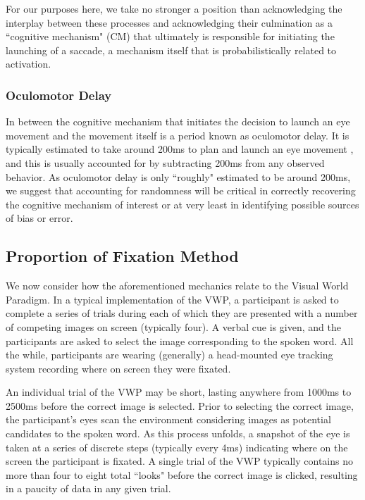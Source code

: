 \documentclass{article}
\begin{document}
For our purposes here, we take no stronger a position than acknowledging the interplay between these processes and acknowledging their culmination as a ``cognitive mechanism" (CM) that ultimately is responsible for initiating the launching of a saccade, a mechanism itself that is probabilistically related to activation.



\subsubsection{Oculomotor Delay}

In between the cognitive mechanism that initiates the decision to launch an eye movement and the movement itself is a period known as oculomotor delay. It is typically estimated to take around 200ms to plan and launch an eye movement \citep{viviani1990time}, and this is usually accounted for by subtracting 200ms from any observed behavior. As oculomotor delay is only ``roughly" estimated to be around 200ms, we suggest that accounting for randomness will be critical in correctly recovering the cognitive mechanism of interest or at very least in identifying possible sources of bias or error. 





\subsection{Proportion of Fixation Method}


We now consider how the aforementioned mechanics relate to the Visual World Paradigm. In a typical implementation of the VWP, a participant is asked to complete a series of trials during each of which they are presented with a number of competing images on screen (typically four). A verbal cue is given, and the participants are asked to select the image corresponding to the spoken word. All the while, participants are wearing (generally) a head-mounted eye tracking system recording where on screen they were fixated. 

An individual trial of the VWP may be short, lasting anywhere from 1000ms to 2500ms before the correct image is selected. Prior to selecting the correct image, the participant's eyes scan the environment considering images as potential candidates to the spoken word. As this process unfolds, a snapshot of the eye is taken at a series of discrete steps (typically every 4ms) indicating where on the screen the participant is fixated. A single trial of the VWP typically contains no more than four to eight total ``looks" before the correct image is clicked, resulting in a paucity of data in any given trial.
\end{document}
